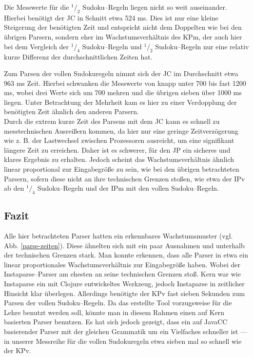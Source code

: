 \documentclass[ngerman,a4paper,abstracton,open=right,twoside=false,toc=listofnumbered,bibtotocnumbered]{scrreprt}
\begin{document}
Die Messwerte für die $^1/_2$ Sudoku--Regeln liegen nicht so weit auseinander. Hierbei benötigt der JC in Schnitt etwa 524 ms. Dies ist nur eine kleine Steigerung der benötigten Zeit und entspricht nicht dem Doppelten wie bei den übrigen Parsern, sondern eher im Wachstumsverhältnis des KPm, der auch hier bei dem Vergleich der $^1/_4$ Sudoku--Regeln und $^1/_2$ Sudoku--Regeln nur eine relativ kurze Differenz der durchschnittlichen Zeiten hat.

Zum Parsen der vollen Sudokuregeln nimmt sich der JC im Durchschnitt etwa 963 ms Zeit. Hierbei schwanken die Messwerte von knapp unter 700 bis fast 1200 ms, wobei drei Werte sich um 700 mehren und die übrigen sieben über 1000 ms liegen. Unter Betrachtung der Mehrheit kam es hier zu einer Verdopplung der benötigten Zeit ähnlich den anderen Parsern.\\

Durch die extrem kurze Zeit des Parsens mit dem JC kann es schnell zu messtechnischen Ausreißern kommen, da hier nur eine geringe Zeitverzögerung wie z. B. der Lastwechsel zwischen Prozessoren ausreicht, um eine signifikant längere Zeit zu erreichen. Daher ist es schwerer, für den JP ein sicheres und klares Ergebnis zu erhalten. Jedoch scheint das Wachstumsverhältnis ähnlich linear proportional zur Eingabegröße zu sein, wie bei den übrigen betrachteten Parsern, sofern diese nicht an ihre technischen Grenzen stoßen, wie etwa der IPv ab den $^1/_4$ Sudoku--Regeln und der IPm mit den vollen Sudoku--Regeln.

\subsection{Fazit}

Alle hier betrachteten Parser hatten ein erkennbares Wachstumsmuster (vgl. Abb. \ref{parse-zeiten}). Diese ähnelten sich mit ein paar Ausnahmen und unterhalb der technischen Grenzen stark. Man konnte erkennen, dass alle Parser in etwa ein linear proportionales Wachstumsverhältnis zur Eingabegröße haben. Wobei der Instaparse--Parser am ehesten an seine technischen Grenzen stoß. Kern war wie Instaparse ein mit Clojure entwickeltes Werkzeug, jedoch Instaparse in zeitlicher Hinsicht klar überlegen. Allerdings benötigte der KPv fast sieben Sekunden zum Parsen der vollen Sudoku--Regeln. Da das erstellte Tool vorzugsweise für die Lehre benutzt werden soll, könnte man in diesem Rahmen einen auf Kern basierten Parser benutzen. Es hat sich jedoch gezeigt, dass ein auf JavaCC basierender Parser mit der gleichen Grammatik um ein Vielfaches schneller ist --- in unserer Messreihe für die vollen Sudokuregeln etwa sieben mal so schnell wie der KPv.
\end{document}
